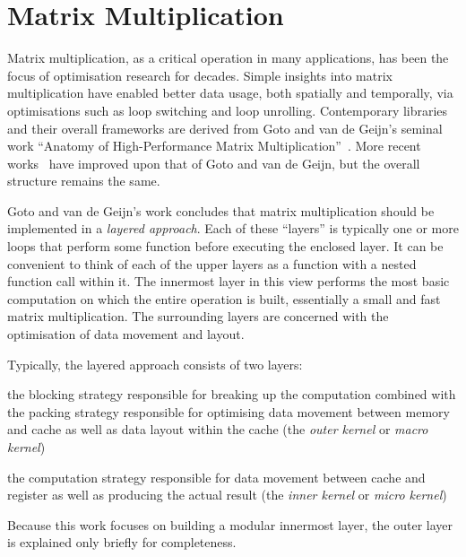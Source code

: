 \documentclass[\main/thesis.tex]{subfiles}
\begin{document}
\chapter{Matrix Multiplication}
\label{cha:matmul}

Matrix multiplication, as a critical operation in many applications, has been the focus of optimisation research for decades.
Simple insights into matrix multiplication have enabled better data usage, both spatially and temporally, via optimisations such as loop switching and loop unrolling.
Contemporary libraries and their overall frameworks are derived from Goto and van de Geijn's seminal work ``Anatomy of High-Performance Matrix Multiplication''~\autocite{goto2008anatomy}.
More recent works~\autocite{vanzee2015blis,zee2016blis} have improved upon that of Goto and van de Geijn, but the overall structure remains the same.

Goto and van de Geijn's work concludes that matrix multiplication should be implemented in a \emph{layered approach}.
Each of these ``layers'' is typically one or more loops that perform some function before executing the enclosed layer.
It can be convenient to think of each of the upper layers as a function with a nested function call within it.
The innermost layer in this view performs the most basic computation on which the entire operation is built, essentially a small and fast matrix multiplication.
The surrounding layers are concerned with the optimisation of data movement and layout.

Typically, the layered approach consists of two layers:
\begin{enumerate*}[itemjoin={{; }}, itemjoin*={{; and }}, label=\textbf{(\arabic*)}, after={.}]
  \item the blocking strategy responsible for breaking up the computation combined with the packing strategy responsible for optimising data movement between memory and cache as well as data layout within the cache (the \emph{outer kernel} or \emph{macro kernel})
  \item the computation strategy responsible for data movement between cache and register as well as producing the actual result (the \emph{inner kernel} or \emph{micro kernel})
\end{enumerate*}
Because this work focuses on building a modular innermost layer, the outer layer is explained only briefly for completeness.
\end{document}
